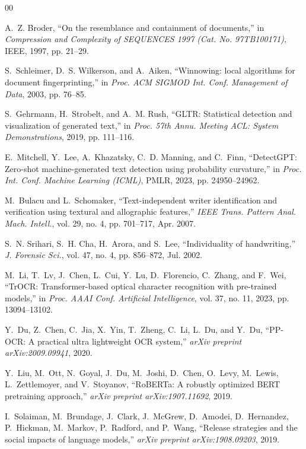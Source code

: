 \documentclass[conference]{IEEEtran}
\begin{document}
\balance
\begin{thebibliography}{00}

A.~Z. Broder, ``On the resemblance and containment of documents,'' in \textit{Compression and Complexity of SEQUENCES 1997 (Cat. No. 97TB100171)}, IEEE, 1997, pp. 21--29.

S.~Schleimer, D.~S. Wilkerson, and A.~Aiken, ``Winnowing: local algorithms for document fingerprinting,'' in \textit{Proc. ACM SIGMOD Int. Conf. Management of Data}, 2003, pp. 76--85.

S.~Gehrmann, H.~Strobelt, and A.~M. Rush, ``GLTR: Statistical detection and visualization of generated text,'' in \textit{Proc. 57th Annu. Meeting ACL: System Demonstrations}, 2019, pp. 111--116.

E.~Mitchell, Y.~Lee, A.~Khazatsky, C.~D. Manning, and C.~Finn, ``DetectGPT: Zero-shot machine-generated text detection using probability curvature,'' in \textit{Proc. Int. Conf. Machine Learning (ICML)}, PMLR, 2023, pp. 24950--24962.

M.~Bulacu and L.~Schomaker, ``Text-independent writer identification and verification using textural and allographic features,'' \textit{IEEE Trans. Pattern Anal. Mach. Intell.}, vol. 29, no. 4, pp. 701--717, Apr. 2007.

S.~N. Srihari, S.~H. Cha, H.~Arora, and S.~Lee, ``Individuality of handwriting,'' \textit{J. Forensic Sci.}, vol. 47, no. 4, pp. 856--872, Jul. 2002.

M.~Li, T.~Lv, J.~Chen, L.~Cui, Y.~Lu, D.~Florencio, C.~Zhang, and F.~Wei, ``TrOCR: Transformer-based optical character recognition with pre-trained models,'' in \textit{Proc. AAAI Conf. Artificial Intelligence}, vol. 37, no. 11, 2023, pp. 13094--13102.

Y.~Du, Z.~Chen, C.~Jia, X.~Yin, T.~Zheng, C.~Li, L.~Du, and Y.~Du, ``PP-OCR: A practical ultra lightweight OCR system,'' \textit{arXiv preprint arXiv:2009.09941}, 2020.

Y.~Liu, M.~Ott, N.~Goyal, J.~Du, M.~Joshi, D.~Chen, O.~Levy, M.~Lewis, L.~Zettlemoyer, and V.~Stoyanov, ``RoBERTa: A robustly optimized BERT pretraining approach,'' \textit{arXiv preprint arXiv:1907.11692}, 2019.

I.~Solaiman, M.~Brundage, J.~Clark, J.~McGrew, D.~Amodei, D.~Hernandez, P.~Hickman, M.~Markov, P.~Radford, and P.~Wang, ``Release strategies and the social impacts of language models,'' \textit{arXiv preprint arXiv:1908.09203}, 2019.


\end{thebibliography}
\end{document}
